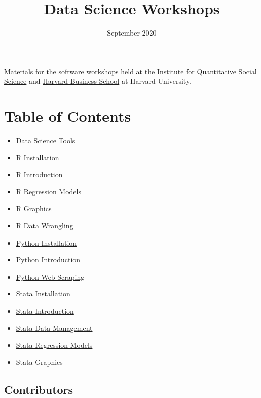 \documentclass[
]{book}
\title{Data Science Workshops}
\author{}
\date{\vspace{-2.5em}September 2020}
\providecommand{\tightlist}{%
  \setlength{\itemsep}{0pt}\setlength{\parskip}{0pt}}
\begin{document}
\maketitle

{
\setcounter{tocdepth}{1}
\tableofcontents
}
Materials for the software workshops held at the \href{http://dss.iq.harvard.edu/}{Institute for Quantitative Social Science} and \href{https://training.rcs.hbs.org}{Harvard Business School} at Harvard University.

\hypertarget{table-of-contents}{%
\chapter*{Table of Contents}\label{table-of-contents}}

\begin{itemize}
\tightlist
\item
  \href{./DataScienceTools.html}{Data Science Tools}
\item
  \href{./Rinstall.html}{R Installation}
\item
  \href{./Rintro.html}{R Introduction}
\item
  \href{./Rmodels.html}{R Regression Models}
\item
  \href{./Rgraphics.html}{R Graphics}
\item
  \href{./RDataWrangling.html}{R Data Wrangling}
\item
  \href{./PythonInstall.html}{Python Installation}
\item
  \href{./PythonIntro.html}{Python Introduction}
\item
  \href{./PythonWebScrape.html}{Python Web-Scraping}
\item
  \href{./StataInstall.html}{Stata Installation}
\item
  \href{./StataIntro.html}{Stata Introduction}
\item
  \href{./StataDataManage.html}{Stata Data Management}
\item
  \href{./StataModels.html}{Stata Regression Models}
\item
  \href{./StataGraphics.html}{Stata Graphics}
\end{itemize}

\hypertarget{contributors}{%
\section*{Contributors}\label{contributors}}
\end{document}
